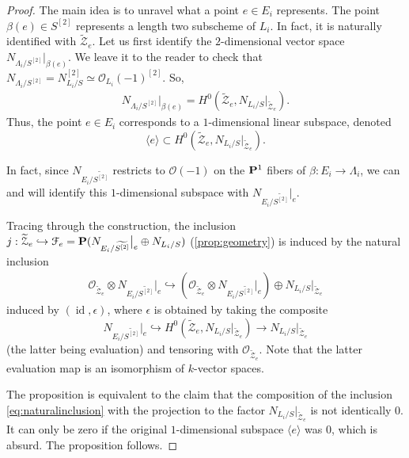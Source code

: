 \documentclass[12pt,reqno]{amsart}
\DeclareMathOperator{\id}{id}
\renewcommand{\to}{{\longrightarrow}}
\numberwithin{equation}{section}
\renewcommand{\O}{\mathcal O}
\newcommand{\td}{\widetilde}
\begin{document}
\begin{proof}
  The main idea is to unravel what a point $e \in E_{i}$ represents.
  The point $\beta(e) \in S^{[2]}$ represents a length two subscheme
  of $L_{i}$. In fact, it is naturally identified with
  $\td{\mathcal{Z}}_{e}$. Let us first identify the $2$-dimensional
  vector space $N_{\Lambda_{i}/S^{[2]}}\big|_{\beta(e)}$.  We leave it
  to the reader to check that
  $N_{\Lambda_{i}/S^{[2]}} = N_{L_{i}/S}^{[2]} \simeq
  \O_{L_{i}}(-1)^{[2]}$.  So,
  \begin{align}
    \label{eq:N2}
    N_{\Lambda_{i}/S^{[2]}}\big|_{\beta(e)} = H^{0}\left(\td{\mathcal{Z}}_{e}, N_{L_{i}/S}\big|_{\td{\mathcal{Z}}_{e}}\right). 
  \end{align}
  Thus, the point $e \in E_{i}$ corresponds to a $1$-dimensional
  linear subspace, denoted
  \[\langle e \rangle \subset H^{0}\left(\td{\mathcal{Z}}_{e},
      N_{L_{i}/S}\big|_{\td{\mathcal{Z}}_{e}}\right).\]

  In fact, since $N_{E_{i}/\td{S^{[2]}}}$ restricts to $\O(-1)$ on the
  $\P^{1}$ fibers of $\beta: E_{i} \to \Lambda_{i}$, we can and will
  identify this $1$-dimensional subspace with
  $N_{E_{i}/\td{S^{[2]}}}\big|_{e}$.

  Tracing through the construction, the inclusion
  $j: \td{\mathcal{Z}}_{e} \hookrightarrow \mathcal{F}_{e} =
  \P(N_{E_{i}/\td{S^{[2]}}}\big|_{e} \oplus N_{L_{i}/S})$
  (\autoref{prop:geometry}) is induced by the natural inclusion
  \begin{align}
    \label{eq:naturalinclusion}
    \O_{\td{\mathcal{Z}}_{e}} \otimes N_{E_{i}/\td{S^{[2]}}}\big|_{e} \hookrightarrow \left(\O_{\td{\mathcal{Z}}_{e}} \otimes N_{E_{i}/\td{S^{[2]}}}\big|_{e} \right) \oplus N_{L_{i}/S}\big|_{\td{\mathcal{Z}}_{e}}
  \end{align}
  induced by $(\id, \epsilon)$, where $\epsilon$ is obtained by taking
  the composite
  \[N_{E_{i}/\td{S^{[2]}}}\big|_{e} \hookrightarrow
    H^{0}\left(\td{\mathcal{Z}}_{e},
      N_{L_{i}/S}\big|_{\td{\mathcal{Z}}_{e}}\right) \to
    N_{L_{i}/S}\big|_{\td{\mathcal{Z}}_{e}}\] (the latter being
  evaluation) and tensoring with $ \O_{\td{\mathcal{Z}}_{e}}$. Note
  that the latter evaluation map is an isomorphism of $k$-vector
  spaces.

  The proposition is equivalent to the claim that the composition of
  the inclusion \eqref{eq:naturalinclusion} with the projection to the
  factor $ N_{L_{i}/S}\big|_{\td{\mathcal{Z}}_{e}}$ is not identically
  $0$.  It can only be zero if the original $1$-dimensional subspace
  $\langle e \rangle$ was $0$, which is absurd.  The proposition
  follows.
\end{proof}
\end{document}
